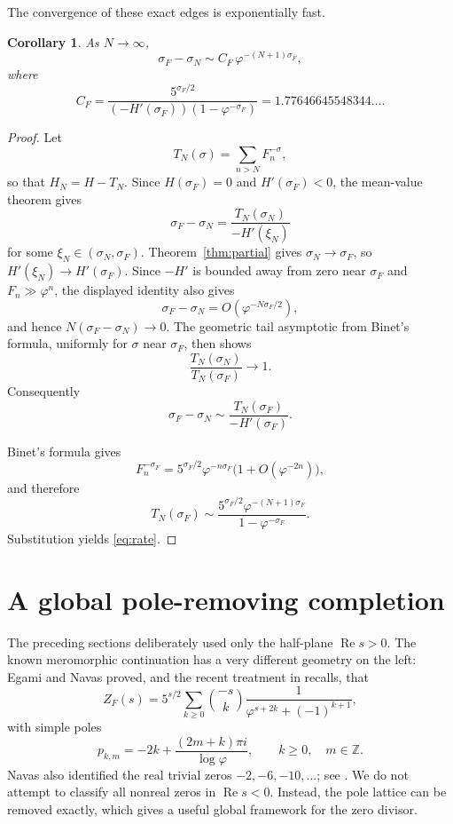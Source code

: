 \documentclass[11pt]{article}
\newtheorem{corollary}[theorem]{Corollary}
\theoremstyle{remark}
\newcommand{\ZF}{Z_F}
\newcommand{\Ree}{\operatorname{Re}}
\begin{document}
The convergence of these exact edges is exponentially fast.

\begin{corollary}\label{cor:rate}
As $N\to\infty$,
\begin{equation}\label{eq:rate}
\sigma_F-\sigma_N
\sim
C_F\,\varphi^{-(N+1)\sigma_F},
\end{equation}
where
\[
C_F=
\frac{5^{\sigma_F/2}}
{(-H'(\sigma_F))(1-\varphi^{-\sigma_F})}
=1.77646645548344\ldots.
\]
\end{corollary}

\begin{proof}
Let
\[
T_N(\sigma)=\sum_{n>N}F_n^{-\sigma},
\]
so that $H_N=H-T_N$.  Since $H(\sigma_F)=0$ and $H'(\sigma_F)<0$, the mean-value theorem gives
\[
\sigma_F-\sigma_N
=\frac{T_N(\sigma_N)}{-H'(\xi_N)}
\]
for some $\xi_N\in(\sigma_N,\sigma_F)$.  Theorem~\ref{thm:partial} gives $\sigma_N\to\sigma_F$, so $H'(\xi_N)\to H'(\sigma_F)$.  Since $-H'$ is bounded away from zero near $\sigma_F$ and $F_n\gg\varphi^n$, the displayed identity also gives
\[
\sigma_F-\sigma_N=O(\varphi^{-N\sigma_F/2}),
\]
and hence $N(\sigma_F-\sigma_N)\to0$.  The geometric tail asymptotic from Binet's formula, uniformly for $\sigma$ near $\sigma_F$, then shows
\[
\frac{T_N(\sigma_N)}{T_N(\sigma_F)}\longrightarrow1.
\]
Consequently
\[
\sigma_F-\sigma_N
\sim \frac{T_N(\sigma_F)}{-H'(\sigma_F)}.
\]

Binet's formula gives
\[
F_n^{-\sigma_F}
=5^{\sigma_F/2}\varphi^{-n\sigma_F}
\bigl(1+O(\varphi^{-2n})\bigr),
\]
and therefore
\[
T_N(\sigma_F)
\sim
\frac{5^{\sigma_F/2}\varphi^{-(N+1)\sigma_F}}
{1-\varphi^{-\sigma_F}}.
\]
Substitution yields \eqref{eq:rate}.
\end{proof}


\section{A global pole-removing completion}\label{sec:completion}

The preceding sections deliberately used only the half-plane $\Ree s>0$.  The known meromorphic continuation has a very different geometry on the left: Egami and Navas proved, and the recent treatment in \cite{AssafKuanLowryDudaWalker2024} recalls, that
\begin{equation}\label{eq:global-continuation}
\ZF(s)
=5^{s/2}\sum_{k\ge0}\binom{-s}{k}
\frac{1}{\varphi^{s+2k}+(-1)^{k+1}},
\end{equation}
with simple poles
\begin{equation}\label{eq:pole-lattice}
p_{k,m}
=-2k+\frac{(2m+k)\pi i}{\log\varphi},
\qquad k\ge0,\quad m\in\mathbb Z.
\end{equation}
Navas also identified the real trivial zeros $-2,-6,-10,\ldots$; see \cite{Navas2001}.  We do not attempt to classify all nonreal zeros in $\Ree s<0$.  Instead, the pole lattice can be removed exactly, which gives a useful global framework for the zero divisor.
\end{document}
